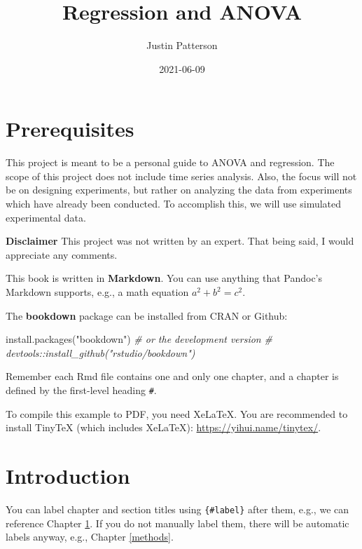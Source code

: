 \documentclass[
]{book}
\title{Regression and ANOVA}
\author{Justin Patterson}
\date{2021-06-09}
\newenvironment{Shaded}{\begin{snugshade}}{\end{snugshade}}
\newcommand{\CommentTok}[1]{\textcolor[rgb]{0.56,0.35,0.01}{\textit{#1}}}
\newcommand{\FunctionTok}[1]{\textcolor[rgb]{0.00,0.00,0.00}{#1}}
\newcommand{\NormalTok}[1]{#1}
\newcommand{\StringTok}[1]{\textcolor[rgb]{0.31,0.60,0.02}{#1}}
\begin{document}
\maketitle

{
\setcounter{tocdepth}{1}
\tableofcontents
}
\hypertarget{prerequisites}{%
\chapter*{Prerequisites}\label{prerequisites}}

This project is meant to be a personal guide to ANOVA and regression. The scope of this project does not include time series analysis. Also, the focus will not be on designing experiments, but rather on analyzing the data from experiments which have already been conducted. To accomplish this, we will use simulated experimental data.

\textbf{Disclaimer}
This project was not written by an expert. That being said, I would appreciate any comments.

This book is written in \textbf{Markdown}. You can use anything that Pandoc's Markdown supports, e.g., a math equation \(a^2 + b^2 = c^2\).

The \textbf{bookdown} package can be installed from CRAN or Github:

\begin{Shaded}
\begin{Highlighting}[]
\FunctionTok{install.packages}\NormalTok{(}\StringTok{"bookdown"}\NormalTok{)}
\CommentTok{\# or the development version}
\CommentTok{\# devtools::install\_github("rstudio/bookdown")}
\end{Highlighting}
\end{Shaded}

Remember each Rmd file contains one and only one chapter, and a chapter is defined by the first-level heading \texttt{\#}.

To compile this example to PDF, you need XeLaTeX. You are recommended to install TinyTeX (which includes XeLaTeX): \url{https://yihui.name/tinytex/}.

\hypertarget{intro}{%
\chapter{Introduction}\label{intro}}

You can label chapter and section titles using \texttt{\{\#label\}} after them, e.g., we can reference Chapter \ref{intro}. If you do not manually label them, there will be automatic labels anyway, e.g., Chapter \ref{methods}.
\end{document}
